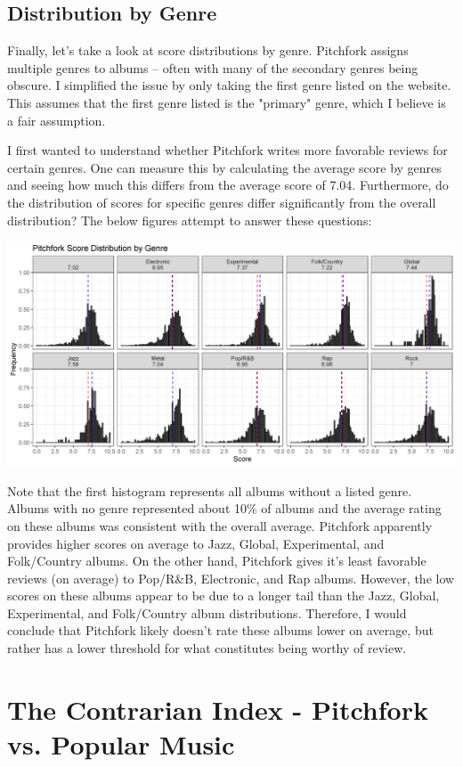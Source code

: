 \documentclass[a4paper,12pt]{article}
\begin{document}
\subsection{Distribution by Genre}

Finally, let's take a look at score distributions by genre. Pitchfork assigns multiple genres to albums -- often with many of the secondary genres being obscure. I simplified the issue by only taking the first genre listed on the website. This assumes that the first genre listed is the "primary" genre, which I believe is a fair assumption. 

I first wanted to understand whether Pitchfork writes more favorable reviews for certain genres. One can measure this by calculating the average score by genres and seeing how much this differs from the average score of 7.04. Furthermore, do the distribution of scores for specific genres differ significantly from the overall distribution? The below figures attempt to answer these questions: 

\includegraphics[width = 0.95\linewidth]{"figures/score_dist_by_genre.png"}

Note that the first histogram represents all albums without a listed genre. Albums with no genre represented about 10\% of albums and the average rating on these albums was consistent with the overall average. Pitchfork apparently provides higher scores on average to Jazz, Global, Experimental, and Folk/Country albums. On the other hand, Pitchfork gives it's least favorable reviews (on average) to Pop/R\&B, Electronic, and Rap albums. However, the low scores on these albums appear to be due to a longer tail than the Jazz, Global, Experimental, and Folk/Country album distributions. Therefore, I would conclude that Pitchfork likely doesn't rate these albums lower on average, but rather has a lower threshold for what constitutes being worthy of review.

\section{The Contrarian Index - Pitchfork vs. Popular Music}
\end{document}
